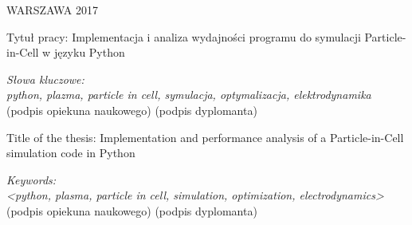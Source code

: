 \vspace{15mm}

WARSZAWA 2017 %

\newpage
\thispagestyle{empty}
\phantom{Nothing here}
\newpage
\clearpage
\phantom{Here neither}

\setcounter{page}{3}
\vspace{-1.5cm}
\begin{flushleft}
	Tytuł pracy: Implementacja i analiza wydajności programu do symulacji Particle-in-Cell w języku Python%
\end{flushleft}
\vspace{0.5cm}

\vspace{0.5cm}
\noindent \textit{Słowa kluczowe: \\ python, plazma, particle in cell, symulacja, optymalizacja, elektrodynamika} %
\vfill
(podpis opiekuna naukowego) \hfill (podpis dyplomanta)

\newpage
\thispagestyle{empty}
\phantom{Nothing here}
\newpage
\clearpage
\phantom{Here neither}

\setcounter{page}{5}
\vspace{-1.5cm}
\begin{flushleft}
	Title of the thesis: Implementation and performance analysis of a Particle-in-Cell simulation code in Python%
\end{flushleft}
\vspace{0.5cm}
\vspace{0.5cm}
\noindent \textit{Keywords: \\ <python, plasma, particle in cell, simulation, optimization, electrodynamics>} %
\vfill
(podpis opiekuna naukowego) \hfill (podpis dyplomanta)

\newpage
\thispagestyle{empty}
\phantom{Nothing here}
\newpage
\clearpage
\phantom{Here neither}


